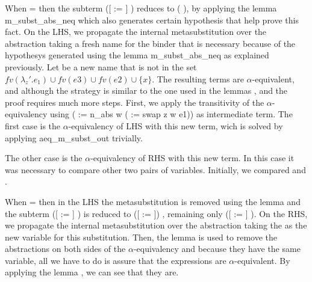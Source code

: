 When  =  then the subterm ([ := ]   ) reduces to (  ), by applying the lemma m\_subst\_abs\_neq which also generates certain hypothesis that help prove this fact. On the LHS, we propagate the internal metasubstitution over the abstraction taking a fresh name for the binder that is necessary because of the hypothesys generated using the lemma m\_subst\_abs\_neq as explained previously. Let  be a new name that is not in the set $fv(\lambda_z'.e_1) \cup fv(e3) \cup fv(e2) \cup \{x\}$. The resulting terms are $\alpha$-equivalent, and although the strategy is similar to the one used in the lemmas ,  and  the proof requires much more steps. First, we apply the transitivity of the $\alpha$-equivalency using ( :=  n\_abs w ( :=  swap z w e1)) as intermediate term. The first case is the $\alpha$-equivalency of LHS with this new term, wich is solved by applying aeq\_m\_subst\_out trivially. 
\begin{coqdoccode}
\end{coqdoccode}
The other case is the $\alpha$-equivalency of RHS with this new term. In this case it was necessary to compare other two pairs of variables. Initially, we compared  and .
\begin{coqdoccode}
\end{coqdoccode}
When  =  then in the LHS the metasubstitution is removed using the lemma  and the subterm ([ := ]    ) is reduced to ([ := ]) , remaining only   ([ := ] ). On the RHS, we propagate the internal metasubstitution over the abstraction taking the  as the new variable for this substitution. Then, the lemma  is used to remove the abstractions on both sides of the $\alpha$-equivalency and because they have the same variable, all we have to do is assure that the expressions are $\alpha$-equivalent. By applying the lemma , we can see that they are. 
\begin{coqdoccode}
\end{coqdoccode}
